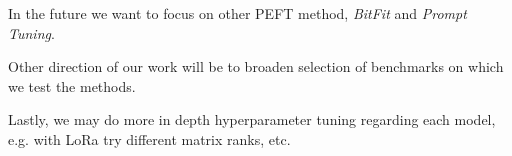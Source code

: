 In the future we want to focus on other PEFT method, \textit{BitFit} and \textit{Prompt Tuning}. 

Other direction of our work will be to broaden selection of benchmarks on which we test the methods.

Lastly, we may do more in depth hyperparameter tuning regarding each model, e.g. with LoRa try different matrix ranks, etc.